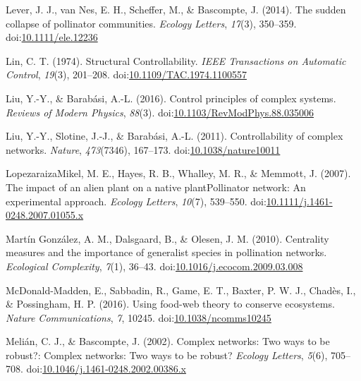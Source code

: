 \documentclass[a4paper]{artikel1}
\theoremstyle{definition}
\theoremstyle{definition}
\theoremstyle{definition}
\theoremstyle{remark}
\begin{document}
\hypertarget{ref-lever_sudden_2014}{}
Lever, J. J., van Nes, E. H., Scheffer, M., \& Bascompte, J. (2014). The
sudden collapse of pollinator communities. \emph{Ecology Letters},
\emph{17}(3), 350--359.
doi:\href{https://doi.org/10.1111/ele.12236}{10.1111/ele.12236}

\hypertarget{ref-lin_structural_1974}{}
Lin, C. T. (1974). Structural Controllability. \emph{IEEE Transactions
on Automatic Control}, \emph{19}(3), 201--208.
doi:\href{https://doi.org/10.1109/TAC.1974.1100557}{10.1109/TAC.1974.1100557}

\hypertarget{ref-liu_control_2016}{}
Liu, Y.-Y., \& Barabási, A.-L. (2016). Control principles of complex
systems. \emph{Reviews of Modern Physics}, \emph{88}(3).
doi:\href{https://doi.org/10.1103/RevModPhys.88.035006}{10.1103/RevModPhys.88.035006}

\hypertarget{ref-liu_controllability_2011}{}
Liu, Y.-Y., Slotine, J.-J., \& Barabási, A.-L. (2011). Controllability
of complex networks. \emph{Nature}, \emph{473}(7346), 167--173.
doi:\href{https://doi.org/10.1038/nature10011}{10.1038/nature10011}

\hypertarget{ref-lopezaraizamikel_impact_2007}{}
Lopezaraiza\textendash{}Mikel, M. E., Hayes, R. B., Whalley, M. R., \&
Memmott, J. (2007). The impact of an alien plant on a native
plantPollinator network: An experimental approach. \emph{Ecology
Letters}, \emph{10}(7), 539--550.
doi:\href{https://doi.org/10.1111/j.1461-0248.2007.01055.x}{10.1111/j.1461-0248.2007.01055.x}

\hypertarget{ref-martin_gonzalez_centrality_2010}{}
Martín González, A. M., Dalsgaard, B., \& Olesen, J. M. (2010).
Centrality measures and the importance of generalist species in
pollination networks. \emph{Ecological Complexity}, \emph{7}(1), 36--43.
doi:\href{https://doi.org/10.1016/j.ecocom.2009.03.008}{10.1016/j.ecocom.2009.03.008}

\hypertarget{ref-mcdonald-madden_using_2016}{}
McDonald-Madden, E., Sabbadin, R., Game, E. T., Baxter, P. W. J.,
Chadès, I., \& Possingham, H. P. (2016). Using food-web theory to
conserve ecosystems. \emph{Nature Communications}, \emph{7}, 10245.
doi:\href{https://doi.org/10.1038/ncomms10245}{10.1038/ncomms10245}

\hypertarget{ref-melian_complex_2002}{}
Melián, C. J., \& Bascompte, J. (2002). Complex networks: Two ways to be
robust?: Complex networks: Two ways to be robust? \emph{Ecology
Letters}, \emph{5}(6), 705--708.
doi:\href{https://doi.org/10.1046/j.1461-0248.2002.00386.x}{10.1046/j.1461-0248.2002.00386.x}
\end{document}
